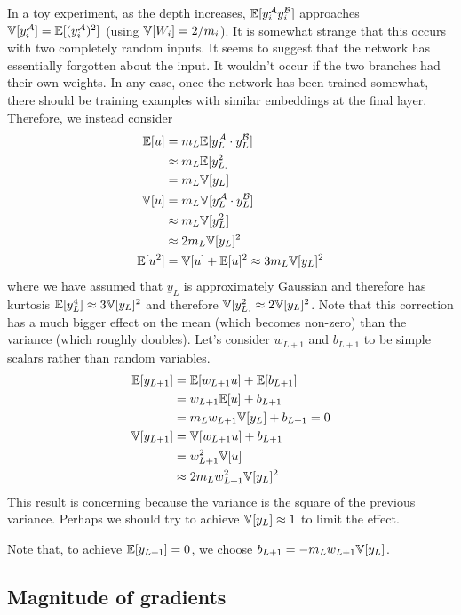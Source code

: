 In a toy experiment, as the depth increases, $\mathbb{E}[y_{i}^{\mathcal{A}} y_{i}^{\mathcal{B}}]$ approaches $\mathbb{V}[y_{i}^{\mathcal{A}}] = \mathbb{E}[(y_{i}^{\mathcal{A}})^2]$ (using $\mathbb{V}[W_{i}] = 2 / m_{i}$).
It is somewhat strange that this occurs with two completely random inputs.
It seems to suggest that the network has essentially forgotten about the input.
It wouldn't occur if the two branches had their own weights.
In any case, once the network has been trained somewhat, there should be training examples with similar embeddings at the final layer.
Therefore, we instead consider
\begin{align}
\mathbb{E}[u]
& = m_{L} \mathbb{E}[y_{L}^{\mathcal{A}} \cdot y_{L}^{\mathcal{B}}] \\
& \approx m_{L} \mathbb{E}[y_{L}^2] \\
& = m_{L} \mathbb{V}[y_{L}] \\
\mathbb{V}[u]
& = m_{L} \mathbb{V}[y_{L}^{\mathcal{A}} \cdot y_{L}^{\mathcal{B}}] \\
& \approx m_{L} \mathbb{V}[y_{L}^2] \\
& \approx 2 m_{L} \mathbb{V}[y_{L}]^2 \\
\mathbb{E}[u^2] & = \mathbb{V}[u] + \mathbb{E}[u]^2 \approx 3 m_{L} \mathbb{V}[y_{L}]^2
\end{align}
where we have assumed that $y_{L}$ is approximately Gaussian and therefore has kurtosis $\mathbb{E}[y_{L}^4] \approx 3 \mathbb{V}[y_L]^2$ and therefore $\mathbb{V}[y_{L}^2] \approx 2 \mathbb{V}[y_L]^2$.
Note that this correction has a much bigger effect on the mean (which becomes non-zero) than the variance (which roughly doubles).
Let's consider $w_{L+1}$ and $b_{L+1}$ to be simple scalars rather than random variables.
\begin{align}
\mathbb{E}[y_{L+1}]
& = \mathbb{E}[w_{L+1} u] + \mathbb{E}[b_{L+1}] \\
& = w_{L+1} \mathbb{E}[u] + b_{L+1} \\
& = m_{L} w_{L+1} \mathbb{V}[y_{L}] + b_{L+1} = 0 \\
\mathbb{V}[y_{L+1}]
& = \mathbb{V}[w_{L+1} u] + b_{L+1} \\
& = w_{L+1}^2 \mathbb{V}[u] \\
& \approx 2 m_{L} w_{L+1}^2 \mathbb{V}[y_{L}]^2
\end{align}
This result is concerning because the variance is the square of the previous variance.
Perhaps we should try to achieve $\mathbb{V}[y_{L}] \approx 1$ to limit the effect.

Note that, to achieve $\mathbb{E}[y_{L+1}] = 0$, we choose $b_{L+1} = -m_{L} w_{L+1} \mathbb{V}[y_{L}]$.

\subsection{Magnitude of gradients}

